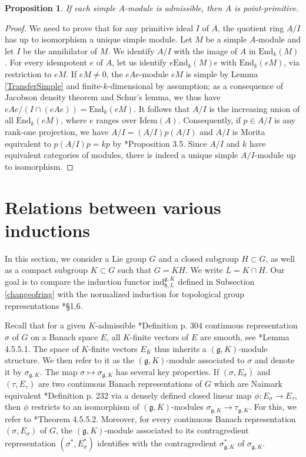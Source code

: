 \documentclass{amsart}
\newtheorem{proposition}[theorem]{Proposition}
\theoremstyle{definition}
\begin{document}
\begin{proposition} \label{criterion_point_primitive}
    If each simple $A$-module is admissible, then $A$ is point-primitive.
\end{proposition}

\begin{proof}
    We need to prove that for any primitive ideal $I$ of $A$, the quotient ring $A/I$ has up to isomorphism a unique simple module. Let $M$ be a simple $A$-module and let $I$ be the annihilator of $M$. We identify $A/I$ with the image of $A$ in $\mathrm{End}_k(M)$. For every idempotent $e$ of $A$, let us identify $e\mathrm{End}_k(M)e$ with $\mathrm{End}_k(eM)$, via restriction to $eM$. If $eM \neq 0$, the $eAe$-module $eM$ is simple by Lemma \ref{TransferSimple} and finite-$k$-dimensional by assumption; as a consequence of Jacobson density theorem and Schur's lemma, we thus have $eAe/(I\cap(eAe)) = \mathrm{End}_k(eM)$. It follows that $A/I$ is the increasing union of all $\mathrm{End}_k(eM)$, where $e$ ranges over $\mathrm{Idem}(A)$. Consequently, if $p \in A/I$ is any rank-one projection, we have $A/I = (A/I) p(A/I)$ and $A/I$ is Morita equivalent to $p(A/I)p = kp$ by \cite{AnhMarki}*{Proposition 3.5}. Since $A/I$ and $k$ have equivalent categories of modules, there is indeed a unique simple $A/I$-module up to isomorphism.
\end{proof}

\section{Relations between various inductions}\label{relInd}

In this section, we consider a Lie group $G$ and a closed subgroup $H \subset G$, as well as a compact subgroup $K \subset G$ such that $G = KH$. We write $L = K\cap H$. Our goal is to compare the induction functor $\mathrm{ind}_{\mathfrak{h}, L}^{\mathfrak{g}, K}$ defined in Subsection \ref{changeofring} with the normalized induction for topological group representations \cite{vandenBan}*{§1.6}.

Recall that for a given $K$-admissible \cite{Warner}*{Definition p. 304} continuous representation $\sigma$ of $G$ on a Banach space $E$, all $K$-finite vectors of $E$ are smooth, see \cite{Warner}*{Lemma 4.5.5.1}. The space of $K$-finite vectors $E_K$ thus inherits a $(\mathfrak{g},K)$-module structure. We then refer to it as the $(\mathfrak{g},K)$-module associated to $\sigma$ and denote it by $\sigma_{\mathfrak{g},K}$. The map $\sigma \mapsto \sigma_{\mathfrak{g},K}$ has several key properties. If $(\sigma, E_\sigma)$ and $(\tau, E_\tau)$ are two continuous Banach representations of $G$ which are Naimark equivalent \cite{Warner}*{Definition p. 232} via a densely defined closed linear map $\phi : E_\sigma \to E_\tau$, then $\phi$ restricts to an isomorphism of $(\mathfrak{g},K)$-modules $\sigma_{\mathfrak{g},K} \to \tau_{\mathfrak{g},K}$. For this, we refer to \cite{Warner}*{Theorem 4.5.5.2}. Moreover, for every continuous Banach representation $(\sigma, E_\sigma)$ of $G$, the $(\mathfrak{g},K)$-module associated to its contragredient representation $(\sigma^*, E_\sigma^*)$ identifies with the contragredient $\sigma^*_{\mathfrak{g},K}$ of $\sigma_{\mathfrak{g},K}$.
\end{document}
